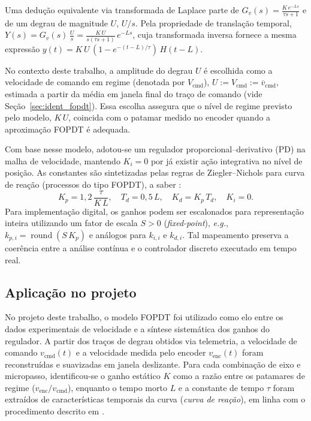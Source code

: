 Uma dedução equivalente via transformada de Laplace parte de
\(G_v(s)=\tfrac{K\,e^{-Ls}}{\tau s + 1}\) e de um degrau de magnitude $U$,
\(U/s\). Pela propriedade de translação temporal,
\(Y(s)=G_v(s)\,\tfrac{U}{s} = \tfrac{K\,U}{s(\tau s+1)}\,e^{-Ls}\), cuja transformada
inversa fornece a mesma expressão
\(y(t)=K\,U\,(1 - e^{-(t-L)/\tau})\,H(t-L)\).

No contexto deste trabalho, a amplitude do degrau $U$ é escolhida como a
velocidade de comando em regime (denotada por $V_{\mathrm{cmd}}$),
\(U := V_{\mathrm{cmd}} := \overline v_{\mathrm{cmd}}\), estimada a
partir da média em janela final do traço de comando (vide
Seção~\ref{sec:ident_fopdt}). Essa escolha assegura que o nível de regime
previsto pelo modelo, $K\,U$, coincida com o patamar medido no encoder
quando a aproximação FOPDT é adequada.

Com base nesse modelo, adotou-se um regulador proporcional–derivativo (PD)
na malha de velocidade, mantendo $K_i=0$ por já existir ação integrativa
no nível de posição. As constantes são sintetizadas pelas regras de
Ziegler–Nichols para curva de reação (processos do tipo FOPDT), a saber
\cite{astrom1995}:
\begin{equation}
    K_p = 1{,}2\,\frac{\tau}{K\,L},\quad
    T_d = 0{,}5\,L,\quad
    K_d = K_p\,T_d,\quad
    K_i = 0.
\end{equation}
Para implementação digital, os ganhos podem ser escalonados para
representação inteira utilizando um fator de escala $S>0$ (\emph{fixed-point}),
\emph{e.g.}, $k_{p,i}=\operatorname{round}(S\,K_p)$ e análogos para $k_{i,i}$ e
$k_{d,i}$. Tal mapeamento preserva a coerência entre a análise contínua e o
controlador discreto executado em tempo real.

\subsection{Aplicação no projeto}\label{subsec:fopdt_aplicacao}

No projeto deste trabalho, o modelo FOPDT foi utilizado como elo entre
os dados experimentais de velocidade e a síntese sistemática dos ganhos
do regulador. A partir dos traços de degrau obtidos via telemetria, a
velocidade de comando $v_\text{cmd}(t)$ e a velocidade medida pelo
encoder $v_\text{enc}(t)$ foram reconstruídas e suavizadas em janela
deslizante. Para cada combinação de eixo e micro\-passo, identificou-se
o ganho estático $K$ como a razão entre os patamares de regime
($v_\text{enc}/v_\text{cmd}$), enquanto o tempo morto $L$ e a constante
de tempo $\tau$ foram extraídos de características temporais da curva
(\emph{curva de reação}), em linha com o procedimento descrito em
\cite{astrom1995}.


